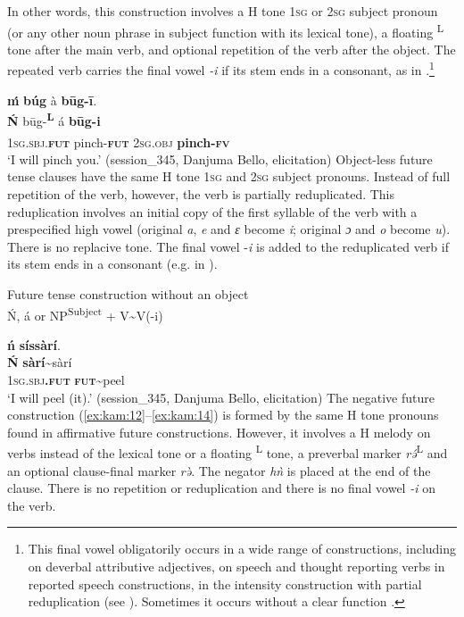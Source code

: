 \documentclass[output=paper,colorlinks,citecolor=brown]{langscibook}
\begin{document}
In other words, this construction involves a H tone \textsc{1sg} or \textsc{2sg} subject pronoun (or any other noun phrase in subject function with its lexical tone), a floating \textsuperscript{L} tone after the main verb, and optional repetition of the verb after the object. The repeated verb carries the final vowel \textit{{}-i} if its stem ends in a consonant, as in .\footnote{This final vowel obligatorily occurs in a wide range of constructions, including on deverbal attributive adjectives, on speech and thought reporting verbs in reported speech constructions, in the intensity construction with partial reduplication (see ). Sometimes it occurs without a clear function \citep[246--251]{Lesage2020}.}

\ea\label{ex:kam:9} 
    \glll \textbf{ḿ} \textbf{búg} à \textbf{būg-ī}.\\
            \textbf{\'{N}} būg-\textbf{\textsuperscript{L}} á \textbf{būg-i}\\
            \textsc{1sg.sbj.\textbf{fut}} pinch-\textbf{\textsc{fut}} \textsc{2sg.obj}\textbf{\textsuperscript{}} \textbf{pinch-\textsc{fv}}\\
    \glt ‘I will pinch you.’ (session\_345, Danjuma Bello, elicitation)
\z 
Object-less future tense clauses  have the same H tone \textsc{1sg} and \textsc{2sg} subject pronouns. Instead of full repetition of the verb, however, the verb is partially reduplicated. This reduplication involves an initial copy of the first syllable of the verb with a prespecified high vowel (original \textit{a}, \textit{e} and \textit{ɛ} become \textit{i}; original \textit{ɔ} and \textit{o} become \textit{u}). There is no replacive tone. The final vowel -\textit{i} is added to the reduplicated verb if its stem ends in a consonant (e.g. in ).

\ea\label{ex:kam:10} 
    Future tense construction without an object\\
    \'{N}, á or NP\textsuperscript{Subject} + V{\textasciitilde}V(-i)
\z 

\ea\label{ex:kam:11} 
    \glll \textbf{ń} \textbf{síssàrí}.\\
        \textbf{\'{N}} \textbf{sàrí{\textasciitilde}}sàrí\\
        \textsc{1sg.sbj}\textbf{.\textsc{fut}} \textbf{\textsc{fut}}\textbf{{\textasciitilde}}peel \\
    \glt ‘I will peel (it).’ (session\_345, Danjuma Bello, elicitation)
\z 
The negative future construction (\ref{ex:kam:12}--\ref{ex:kam:14}) is formed by the same H tone pronouns found in affirmative future constructions. However, it involves a H melody on verbs instead of the lexical tone or a floating \textsuperscript{L} tone, a preverbal marker \textit{rə́}\textsuperscript{L} and an optional clause-final marker \textit{rə̀}. The negator \textit{hǹ} is placed at the end of the clause. There is no repetition or reduplication and there is no final vowel \textit{{}-i} on the verb.
\end{document}
